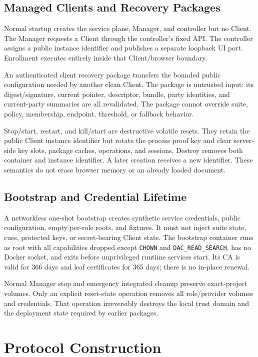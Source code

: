 \documentclass[sigconf,anonymous]{acmart}
\begin{document}
\subsection{Managed Clients and Recovery Packages}

Normal startup creates the service plane, Manager, and controller but no
Client. The Manager requests a Client through the controller's fixed API. The
controller assigns a public instance identifier and publishes a separate
loopback UI port. Enrollment executes entirely inside that Client/browser
boundary.

An authenticated client recovery package transfers the bounded public
configuration needed by another clean Client. The package is untrusted input:
its digest/signature, current pointer, descriptor, bundle, party identities,
and current-party summaries are all revalidated. The package cannot override
suite, policy, membership, endpoint, threshold, or fallback behavior.

Stop/start, restart, and kill/start are destructive volatile resets. They
retain the public Client instance identifier but rotate the process proof key
and clear server-side key slots, package caches, operations, and sessions.
Destroy removes both container and instance identifier. A later creation
receives a new identifier. These semantics do not erase browser memory or an
already loaded document.

\subsection{Bootstrap and Credential Lifetime}

A networkless one-shot bootstrap creates synthetic service credentials,
public configuration, empty per-role roots, and fixtures. It must not inject
suite state, cues, protected keys, or secret-bearing Client state. The
bootstrap container runs as root with all capabilities dropped except
\texttt{CHOWN} and \texttt{DAC\_READ\_SEARCH}, has no Docker socket, and exits
before unprivileged runtime services start. Its CA is valid for 366 days and
leaf certificates for 365 days; there is no in-place renewal.

Normal Manager stop and emergency integrated cleanup preserve exact-project
volumes. Only an explicit reset-state operation removes all role/provider
volumes and credentials. That operation irreversibly destroys the local trust
domain and the deployment state required by earlier packages.

\section{Protocol Construction}
\label{sec:protocol}
\end{document}
